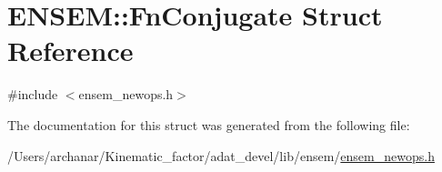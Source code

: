 \hypertarget{structENSEM_1_1FnConjugate}{}\section{E\+N\+S\+EM\+:\+:Fn\+Conjugate Struct Reference}
\label{structENSEM_1_1FnConjugate}


{\ttfamily \#include $<$ensem\+\_\+newops.\+h$>$}



The documentation for this struct was generated from the following file\+:\begin{DoxyCompactItemize}
\item 
/\+Users/archanar/\+Kinematic\+\_\+factor/adat\+\_\+devel/lib/ensem/\mbox{\hyperlink{lib_2ensem_2ensem__newops_8h}{ensem\+\_\+newops.\+h}}\end{DoxyCompactItemize}
